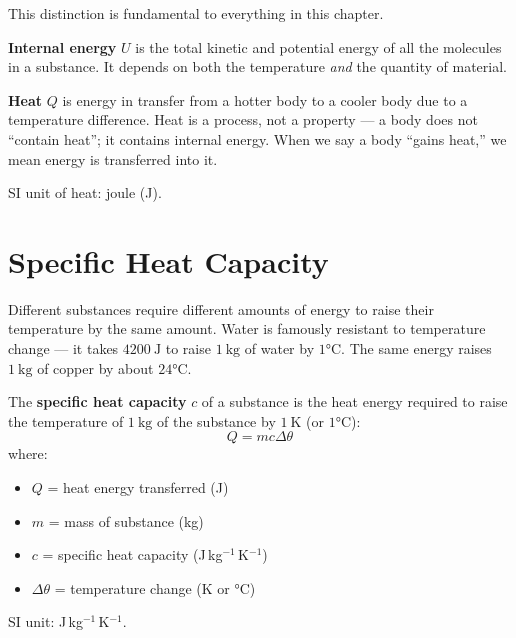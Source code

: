 This distinction is fundamental to everything in
this chapter.

\begin{definitionbox}
\textbf{Internal energy} $U$ is the total kinetic
and potential energy of all the molecules in a
substance. It depends on both the temperature
\textit{and} the quantity of material.

\textbf{Heat} $Q$ is energy in transfer from a
hotter body to a cooler body due to a temperature
difference. Heat is a process, not a property ---
a body does not ``contain heat''; it contains
internal energy. When we say a body ``gains heat,''
we mean energy is transferred into it.

SI unit of heat: joule (J).
\end{definitionbox}

\section{Specific Heat Capacity}

Different substances require different amounts of
energy to raise their temperature by the same amount.
Water is famously resistant to temperature change ---
it takes $4200\ \text{J}$ to raise $1\ \text{kg}$ of
water by $1°\text{C}$. The same energy raises $1\ \text{kg}$
of copper by about $24°\text{C}$.

\begin{definitionbox}
The \textbf{specific heat capacity} $c$ of a substance
is the heat energy required to raise the temperature
of $1\ \text{kg}$ of the substance by $1\ \text{K}$
(or $1°\text{C}$):
\[
  Q = mc\Delta\theta
\]
where:
\begin{itemize}[noitemsep]
  \item $Q$ = heat energy transferred (J)
  \item $m$ = mass of substance (kg)
  \item $c$ = specific heat capacity
  (J\,kg$^{-1}$\,K$^{-1}$)
  \item $\Delta\theta$ = temperature change (K or °C)
\end{itemize}
SI unit: J\,kg$^{-1}$\,K$^{-1}$.
\end{definitionbox}

